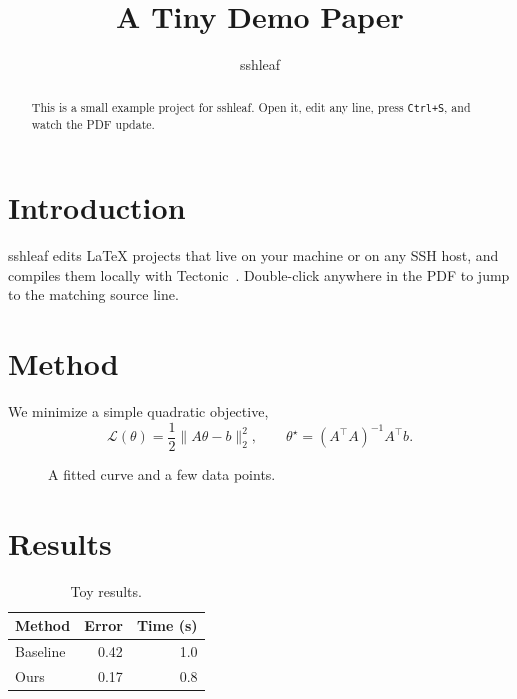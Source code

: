\documentclass[11pt]{article}
\title{A Tiny Demo Paper}
\author{sshleaf}
\date{}
\begin{document}
\maketitle

\begin{abstract}
  This is a small example project for sshleaf. Open it, edit any line,
  press \texttt{Ctrl+S}, and watch the PDF update.
\end{abstract}

\section{Introduction}
\label{sec:intro}

sshleaf edits LaTeX projects that live on your machine or on any SSH host,
and compiles them locally with Tectonic~\cite{tectonic}.
Double-click anywhere in the PDF to jump to the matching source line.

\section{Method}

We minimize a simple quadratic objective,
\begin{equation}
  \mathcal{L}(\theta) = \frac{1}{2} \lVert A \theta - b \rVert_2^2,
  \qquad
  \theta^\star = (A^\top A)^{-1} A^\top b .
\end{equation}

\begin{figure}[h]
  \centering
  \caption{A fitted curve and a few data points.}
  \label{fig:fit}
\end{figure}

\section{Results}

\begin{table}[h]
  \centering
  \begin{tabular}{lrr}
    \toprule
    Method & Error & Time (s) \\
    \midrule
    Baseline & 0.42 & 1.0 \\
    Ours     & 0.17 & 0.8 \\
    \bottomrule
  \end{tabular}
  \caption{Toy results.}
\end{table}



\end{document}
